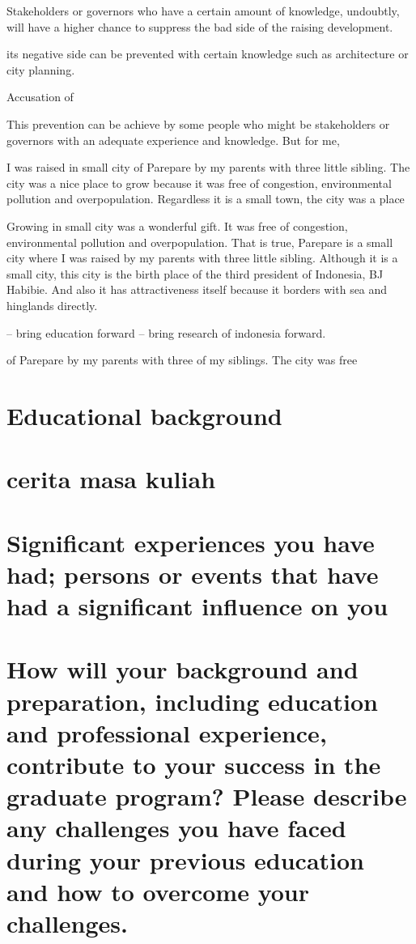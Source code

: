 \documentclass[11pt]{simart} %
\begin{document}
Stakeholders or governors who have a certain amount of knowledge, undoubtly, will have a higher chance to suppress the bad side of the raising development.

its negative side can be prevented with certain knowledge such as architecture or city planning.

Accusation of

This prevention can be achieve by some people who might be stakeholders or governors with an adequate experience and knowledge. But for me,

I was raised in small city of Parepare by my parents with three little sibling. The city was a nice place to grow because it was free of congestion, environmental pollution and overpopulation. Regardless it is a small town, the city was a place

Growing in small city was a wonderful gift. It was free of congestion, environmental pollution and overpopulation. That is true, Parepare is a small city where I was raised by my parents with three little sibling. Although it is a small city, this city is the birth place of the third president of Indonesia, BJ Habibie. And also it has attractiveness itself because it borders with sea and hinglands directly.

-- bring education forward
-- bring research of indonesia forward.

of Parepare by my parents with three of my siblings.
The city was free

\section{Educational background}
\section*{cerita masa kuliah}

\section{Significant experiences you have had; persons or events that have had a significant influence on you}
\section*{How will your background and preparation, including education and professional experience, contribute to your success in the graduate program? Please describe any challenges you have faced during your previous education and how to overcome your challenges.}
\end{document}
